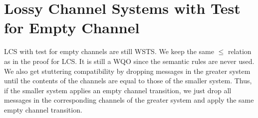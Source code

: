\section{Lossy Channel Systems with Test for Empty Channel}
LCS with test for empty channels are still WSTS. We keep the same $\leq$ relation as in the proof for LCS. It is still a WQO since the semantic rules are never used. We also get stuttering compatibility by dropping messages in the greater system until the contents of the channels are equal to those of the smaller system. Thus, if the smaller system applies an empty channel transition, we just drop all messages in the corresponding channels of the greater system and apply the same empty channel transition.